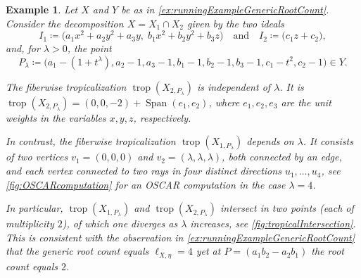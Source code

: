 \documentclass[12pt,reqno,a4paper]{amsart}
\theoremstyle{theoremstyle}
\theoremstyle{examplestyle}
\newtheorem{example}[theorem]{Example}
\theoremstyle{algorithmstyle}
\DeclareMathOperator{\Span}{Span}
\DeclareMathOperator{\Trop}{trop}
\begin{document}
\begin{example}
  \label{ex:runningExampleFiberwiseTropicalization}
  Let $X$ and $Y$ be as in \cref{ex:runningExampleGenericRootCount}.  Consider the decomposition $X = X_1\cap X_2$ given by the two ideals
  \begin{equation*}
    I_1\coloneqq \big(a_1x^2+a_2y^2+a_3y,\; b_1x^2+b_2y^2+b_3z\big) \quad\text{and}\quad I_2\coloneqq \big( c_1z+c_2 \big),
  \end{equation*}
  and, for $\lambda>0$, the point
  \begin{equation*}
    P_\lambda\coloneqq \Big(a_1-(1+t^\lambda), a_2-1, a_3-1, b_1-1, b_2-1, b_3-1, c_1-t^2, c_2-1\Big) \in Y.
  \end{equation*}

  The fiberwise tropicalization $\Trop(X_{2,P_\lambda})$ is independent of $\lambda$.  It is $\Trop(X_{2,P_\lambda})=(0,0,-2)+\Span(e_1,e_2)$, where $e_1,e_2,e_3$ are the unit weights in the variables $x,y,z$, respectively.

  In contrast, the fiberwise tropicalization $\Trop(X_{1,P_\lambda})$ depends on $\lambda$.  It consists of two vertices $v_1=(0,0,0)$ and $v_2=(\lambda,\lambda,\lambda)$, both connected by an edge, and each vertex connected to two rays in four distinct directions $u_1,\dots,u_4$, see \cref{fig:OSCARcomputation} for an \textsc{OSCAR} computation in the case $\lambda=4$.

  In particular, $\Trop(X_{1,P_\lambda})$ and $\Trop(X_{2,P_\lambda})$ intersect in two points (each of multiplicity $2$), of which one diverges as $\lambda$ increases, see \cref{fig:tropicalIntersection}.
  This is consistent with the observation in \cref{ex:runningExampleGenericRootCount} that the generic root count equals $\ell_{X,\eta}=4$ yet at $P=(a_1b_2-a_2b_1)$ the root count equals $2$.
\end{example}
\end{document}
